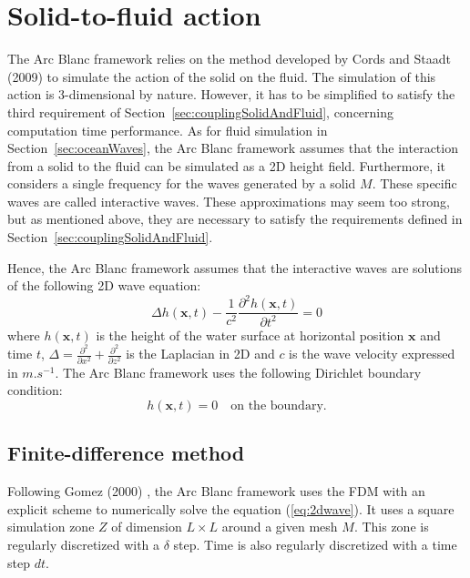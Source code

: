 \documentclass[final]{jcgt}
\def\Framework{The Arc Blanc framework\xspace}
\def\framework{the Arc Blanc framework\xspace}
\begin{document}
\section{Solid-to-fluid action}
\label{sec:solidToFluidAction}
\Framework relies on the method developed by Cords and Staadt (2009) \cite{cordsRealTimeOpenWater2009} to simulate the action of the solid on the fluid.
The simulation of this action is 3-dimensional by nature.
However, it has to be simplified to satisfy the third requirement of Section~\ref{sec:couplingSolidAndFluid}, concerning computation time performance.
As for fluid simulation in Section~\ref{sec:oceanWaves}, \framework assumes that the interaction from a solid to the fluid can be simulated as a 2D height field.
Furthermore, it considers a single frequency for the waves generated by a solid $M$.
These specific waves are called interactive waves.
These approximations may seem too strong, but as mentioned above, they are necessary to satisfy the requirements defined in Section~\ref{sec:couplingSolidAndFluid}.

Hence, \framework assumes that the interactive waves are solutions of the following 2D wave equation:
\begin{equation}
	\label{eq:2dwave}
	\Delta h(\mathbf x,t)-\frac{1}{c^2}\frac{\partial^2 h(\mathbf x,t)}{\partial t^2}=0
\end{equation}
where $h(\mathbf x,t)$ is the height of the water surface at horizontal position $\mathbf x$ and time $t$, $\Delta=\frac{\partial^2}{\partial x^2}+\frac{\partial^2}{\partial z^2}$ is the Laplacian in 2D and $c$ is the wave velocity expressed in $m.s^{-1}$.
\Framework uses the following Dirichlet boundary condition:
\begin{equation}
	h(\mathbf x,t) = 0 \text{~~~on the boundary.}
\end{equation}

\subsection{Finite-difference method}
\label{subsec:finiteDifferenceMethod}
Following Gomez (2000) \cite{gomezInteractiveSimulationWater2000},
\framework  uses the FDM with an explicit scheme to numerically solve the equation (\ref{eq:2dwave}).
It uses a square simulation zone $Z$ of dimension $L\times L$ around a given mesh $M$.
This zone is regularly discretized with a $\delta$ step.
Time is also regularly discretized with a time step $dt$.
\end{document}
